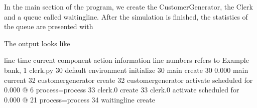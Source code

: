 \documentclass[letterpaper,10pt,english]{sphinxmanual}
\begin{document}
In the main section of the program, we create the CustomerGenerator, the Clerk and a queue called waitingline.
After the simulation is finished, the statistics of the queue are presented with

\begin{sphinxVerbatim}[commandchars=\\\{\}]
\end{sphinxVerbatim}

The output looks like

\begin{sphinxVerbatim}[commandchars=\\\{\}]
line\PYGZsh{}         time current component    action                               information
\PYGZhy{}\PYGZhy{}\PYGZhy{}\PYGZhy{}\PYGZhy{}   \PYGZhy{}\PYGZhy{}\PYGZhy{}\PYGZhy{}\PYGZhy{}\PYGZhy{}\PYGZhy{}\PYGZhy{}\PYGZhy{}\PYGZhy{} \PYGZhy{}\PYGZhy{}\PYGZhy{}\PYGZhy{}\PYGZhy{}\PYGZhy{}\PYGZhy{}\PYGZhy{}\PYGZhy{}\PYGZhy{}\PYGZhy{}\PYGZhy{}\PYGZhy{}\PYGZhy{}\PYGZhy{}\PYGZhy{}\PYGZhy{}\PYGZhy{}\PYGZhy{}\PYGZhy{} \PYGZhy{}\PYGZhy{}\PYGZhy{}\PYGZhy{}\PYGZhy{}\PYGZhy{}\PYGZhy{}\PYGZhy{}\PYGZhy{}\PYGZhy{}\PYGZhy{}\PYGZhy{}\PYGZhy{}\PYGZhy{}\PYGZhy{}\PYGZhy{}\PYGZhy{}\PYGZhy{}\PYGZhy{}\PYGZhy{}\PYGZhy{}\PYGZhy{}\PYGZhy{}\PYGZhy{}\PYGZhy{}\PYGZhy{}\PYGZhy{}\PYGZhy{}\PYGZhy{}\PYGZhy{}\PYGZhy{}\PYGZhy{}\PYGZhy{}\PYGZhy{}\PYGZhy{}  \PYGZhy{}\PYGZhy{}\PYGZhy{}\PYGZhy{}\PYGZhy{}\PYGZhy{}\PYGZhy{}\PYGZhy{}\PYGZhy{}\PYGZhy{}\PYGZhy{}\PYGZhy{}\PYGZhy{}\PYGZhy{}\PYGZhy{}\PYGZhy{}\PYGZhy{}\PYGZhy{}\PYGZhy{}\PYGZhy{}\PYGZhy{}\PYGZhy{}\PYGZhy{}\PYGZhy{}\PYGZhy{}\PYGZhy{}\PYGZhy{}\PYGZhy{}\PYGZhy{}\PYGZhy{}\PYGZhy{}\PYGZhy{}\PYGZhy{}\PYGZhy{}\PYGZhy{}\PYGZhy{}\PYGZhy{}\PYGZhy{}\PYGZhy{}\PYGZhy{}\PYGZhy{}\PYGZhy{}\PYGZhy{}\PYGZhy{}\PYGZhy{}\PYGZhy{}\PYGZhy{}\PYGZhy{}
                                        line numbers refers to               Example \PYGZhy{} bank, 1 clerk.py
   30                                   default environment initialize
   30                                   main create
   30        0.000 main                 current
   32                                   customergenerator create
   32                                   customergenerator activate           scheduled for      0.000 @    6  process=process
   33                                   clerk.0 create
   33                                   clerk.0 activate                     scheduled for      0.000 @   21  process=process
   34                                   waitingline create

\end{sphinxVerbatim}
\end{document}
